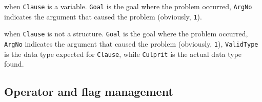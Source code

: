 \begin{itemize}
     when \texttt{Clause} is a variable. \texttt{Goal} is the goal where the problem occurred, \texttt{ArgNo} indicates the argument that caused the problem (obviously, \texttt{1}).

     when \texttt{Clause} is not a structure. \texttt{Goal} is the goal where the problem occurred, \texttt{ArgNo} indicates the argument that caused the problem (obviously, \texttt{1}), \texttt{ValidType} is the data type expected for \texttt{Clause}, while \texttt{Culprit} is the actual data type found.

\end{itemize}

\subsection{Operator and flag management}
\label{ssec:operator-and-flag-management}

